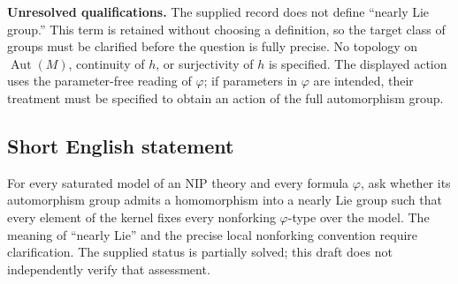 \documentclass[11pt]{article}
\begin{document}
\textbf{Unresolved qualifications.} The supplied record does not define ``nearly Lie group.'' This term is retained without choosing a definition, so the target class of groups must be clarified before the question is fully precise. No topology on \(\operatorname{Aut}(M)\), continuity of \(h\), or surjectivity of \(h\) is specified. The displayed action uses the parameter-free reading of \(\varphi\); if parameters in \(\varphi\) are intended, their treatment must be specified to obtain an action of the full automorphism group.
\subsection{Short English statement}
For every saturated model of an NIP theory and every formula \(\varphi\), ask whether its automorphism group admits a homomorphism into a nearly Lie group such that every element of the kernel fixes every nonforking \(\varphi\)-type over the model. The meaning of ``nearly Lie'' and the precise local nonforking convention require clarification. The supplied status is partially solved; this draft does not independently verify that assessment.
\end{document}
